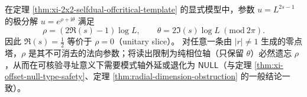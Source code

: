 \begin{corollary}\label{cor:xi-2x2-selfdual-orthogonal-axis-projection-forget}
在定理 \ref{thm:xi-2x2-selfdual-offcritical-template} 的显式模型中，参数
\(
u=L^{2s-1}
\)
的极分解 \(u=e^{\rho+\mathrm{i}\theta}\) 满足
\[
\rho=(2\Re(s)-1)\log L,\qquad \theta=2\Im(s)\log L\ (\mathrm{mod}\ 2\pi).
\]
因此 \(\Re(s)=\tfrac12\) 等价于 \(\rho=0\)（unitary slice）。
对任意一条由 \(|r|\neq 1\) 生成的零点塔，\(\rho\) 是其不可消去的法向参数；将读出限制为纯相位轴（只保留 \(\theta\)）必然遗忘 \(\rho\)，从而在可核验寻址意义下需要模式轴外延或退化为 \(\mathsf{NULL}\)（与定理 \ref{thm:xi-offset-null-type-safety}、定理 \ref{thm:radial-dimension-obstruction} 的一般结论一致）。
\end{corollary}
